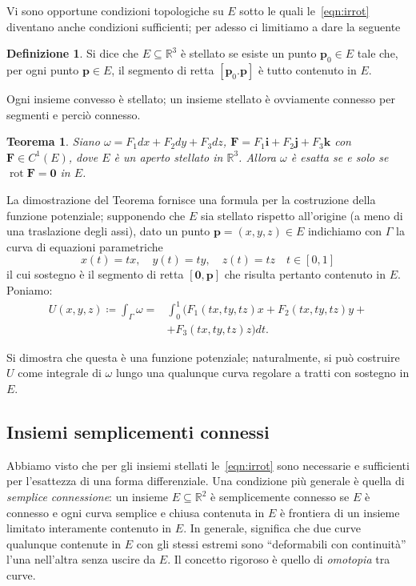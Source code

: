 \documentclass[a4paper]{book}
\DeclareMathOperator{\rot}{rot}
\numberwithin{equation}{section}
\theoremstyle{plain}
\newtheorem{teor}{Teorema}[section]
\theoremstyle{definition}
\newtheorem{defn}{Definizione}[section]
\theoremstyle{remark}
\renewcommand{\vec}{\boldsymbol}
\theoremstyle{example}
\begin{document}
Vi sono opportune condizioni topologiche su $E$ sotto le quali le~\eqref{eqn:irrot} diventano anche condizioni sufficienti; per adesso ci limitiamo a dare la seguente
\begin{defn}
	Si dice che $E \subseteq \mathbb{R}^3$ è stellato se esiste un punto $\vec{p}_0 \in E$ tale che, per ogni punto $\vec{p} \in E$, il segmento di retta $[\vec{p}_0. \vec{p}]$ è tutto contenuto in $E$.
\end{defn}

Ogni insieme convesso è stellato; un insieme stellato è ovviamente connesso per segmenti e perciò connesso.

\begin{teor}
	Siano $\omega = F_1dx + F_2 dy + F_3 dz$, $\vec{F} = F_1\vec{i} + F_2\vec{j} + F_3\vec{k}$ con $\vec{F} \in C^1(E)$, dove $E$ è un aperto stellato in $\mathbb{R}^3$. Allora $\omega$ è esatta se e solo se $\rot{\vec{F}} = \vec{0}$ in $E$.
\end{teor}

La dimostrazione del Teorema fornisce una formula per la costruzione della funzione potenziale; supponendo che $E$ sia stellato rispetto all'origine (a meno di una traslazione degli assi), dato un punto $\vec{p} = (x, y, z) \in E$ indichiamo con $\Gamma$ la curva di equazioni parametriche
\begin{equation*}
	x(t) = tx, \quad y(t) = ty, \quad z(t) = tz \quad t \in [0, 1]
\end{equation*}
il cui sostegno è il segmento di retta $[\vec{0}, \vec{p}]$ che risulta pertanto contenuto in $E$. Poniamo:
\begin{equation}
	\begin{split}
		U(x, y, z) \coloneqq \int_{\Gamma}\omega = &\int_0^1 (F_1(tx, ty, tz)x + F_2(tx, ty, tz)y + \\ &+ F_3(tx, ty, tz)z) dt.
	\end{split}
\end{equation}

Si dimostra che questa è una funzione potenziale; naturalmente, si può costruire $U$ come integrale di $\omega$ lungo una qualunque curva regolare a tratti con sostegno in $E$.

\subsection{Insiemi semplicementi connessi}
Abbiamo visto che per gli insiemi stellati le~\eqref{eqn:irrot} sono necessarie e sufficienti per l'esattezza di una forma differenziale. Una condizione più generale è quella di \emph{semplice connessione}: un insieme $E \subseteq \mathbb{R}^2$ è semplicemente connesso se $E$ è connesso e ogni curva semplice e chiusa contenuta in $E$ è frontiera di un insieme limitato interamente contenuto in $E$. In generale, significa che due curve qualunque contenute in $E$ con gli stessi estremi sono ``deformabili con continuità''  l'una nell'altra senza uscire da $E$. Il concetto rigoroso è quello di \emph{omotopia} tra curve.
\end{document}
